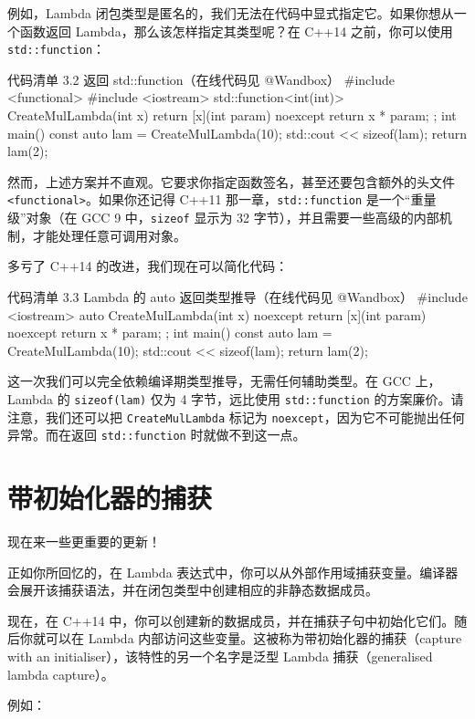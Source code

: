 例如，Lambda 闭包类型是匿名的，我们无法在代码中显式指定它。如果你想从一个函数返回 Lambda，那么该怎样指定其类型呢？在 C++14 之前，你可以使用 \texttt{std::function}：

\begin{codeboxt}{代码清单 3.2 返回 std::function（在线代码见 @Wandbox）}
#include <functional>
#include <iostream>
std::function<int(int)> CreateMulLambda(int x) {
return [x](int param) noexcept { return x * param; };
}
int main() {
const auto lam = CreateMulLambda(10);
std::cout << sizeof(lam);
return lam(2);
}
\end{codeboxt}

然而，上述方案并不直观。它要求你指定函数签名，甚至还要包含额外的头文件 \texttt{<functional>}。如果你还记得 C++11 那一章，\texttt{std::function} 是一个“重量级”对象（在 GCC 9 中，\texttt{sizeof} 显示为 32 字节），并且需要一些高级的内部机制，才能处理任意可调用对象。

多亏了 C++14 的改进，我们现在可以简化代码：

\begin{codeboxt}{代码清单 3.3 Lambda 的 auto 返回类型推导（在线代码见 @Wandbox）}
#include <iostream>
auto CreateMulLambda(int x) noexcept {
return [x](int param) noexcept { return x * param; };
}
int main() {
const auto lam = CreateMulLambda(10);
std::cout << sizeof(lam);
return lam(2);
}
\end{codeboxt}

这一次我们可以完全依赖编译期类型推导，无需任何辅助类型。在 GCC 上，Lambda 的 \texttt{sizeof(lam)} 仅为 4 字节，远比使用 \texttt{std::function} 的方案廉价。请注意，我们还可以把 \texttt{CreateMulLambda} 标记为 \texttt{noexcept}，因为它不可能抛出任何异常。而在返回 \texttt{std::function} 时就做不到这一点。

\section{带初始化器的捕获}

现在来一些更重要的更新！

正如你所回忆的，在 Lambda 表达式中，你可以从外部作用域捕获变量。编译器会展开该捕获语法，并在闭包类型中创建相应的非静态数据成员。

现在，在 C++14 中，你可以创建新的数据成员，并在捕获子句中初始化它们。随后你就可以在 Lambda 内部访问这些变量。这被称为带初始化器的捕获（capture with an initialiser），该特性的另一个名字是泛型 Lambda 捕获（generalised lambda capture）。

例如：

